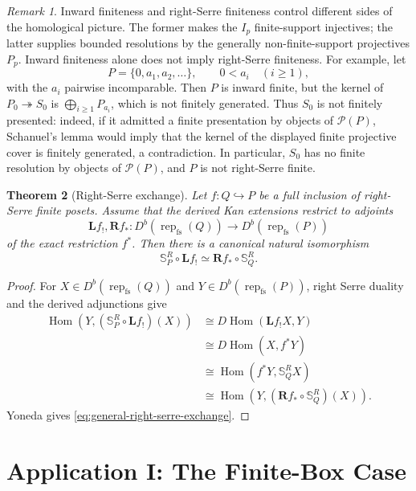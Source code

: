 \documentclass[12pt,reqno]{amsart}
\newtheorem{theorem}{Theorem}[section]
\theoremstyle{definition}
\theoremstyle{remark}
\newtheorem{remark}[theorem]{Remark}
\newcommand{\Rep}{\operatorname{rep}}
\newcommand{\Hom}{\operatorname{Hom}}
\begin{document}
\begin{remark}\label{rem:inward-not-serre}
Inward finiteness and right-Serre finiteness control different sides of the
homological picture.  The former makes the $I_p$ finite-support injectives;
the latter supplies bounded resolutions by the generally non-finite-support
projectives $P_p$.  Inward finiteness alone does not imply right-Serre
finiteness.  For example, let
\[
P=\{0,a_1,a_2,\ldots\},
\qquad
0<a_i\quad(i\ge1),
\]
with the $a_i$ pairwise incomparable.  Then $P$ is inward finite, but the
kernel of $P_0\twoheadrightarrow S_0$ is
$\bigoplus_{i\ge1}P_{a_i}$, which is not finitely generated.  Thus $S_0$
is not finitely presented: indeed, if it admitted a finite presentation by
objects of $\mathcal P(P)$, Schanuel's lemma would imply that the kernel of
the displayed finite projective cover is finitely generated, a contradiction.
In particular, $S_0$ has no finite resolution by objects of
$\mathcal P(P)$, and $P$ is not right-Serre finite.
\end{remark}

\begin{theorem}[Right-Serre exchange]\label{thm:right-serre-exchange}
Let $f:Q\hookrightarrow P$ be a full inclusion of right-Serre finite posets.
Assume that the derived Kan extensions restrict to adjoints
\[
\mathbf L f_!,\mathbf R f_*:
D^b(\Rep_{\mathrm{fs}}(Q))\longrightarrow
D^b(\Rep_{\mathrm{fs}}(P))
\]
of the exact restriction $f^*$.  Then there is a canonical natural
isomorphism
\begin{equation}\label{eq:general-right-serre-exchange}
\boxed{\mathbb S_P^R\circ\mathbf L f_!
\simeq\mathbf R f_*\circ\mathbb S_Q^R.}
\end{equation}
\end{theorem}

\begin{proof}
For $X\in D^b(\Rep_{\mathrm{fs}}(Q))$ and
$Y\in D^b(\Rep_{\mathrm{fs}}(P))$, right Serre duality and the derived
adjunctions give
\begin{align*}
\Hom(Y,(\mathbb S_P^R\circ\mathbf L f_!)(X))
&\cong D\Hom(\mathbf L f_!X,Y)\\
&\cong D\Hom(X,f^*Y)\\
&\cong\Hom(f^*Y,\mathbb S_Q^R X)\\
&\cong\Hom(Y,(\mathbf R f_*\circ\mathbb S_Q^R)(X)).
\end{align*}
Yoneda gives \eqref{eq:general-right-serre-exchange}.
\end{proof}

\section{Application I: The Finite-Box Case}
\label{sec:finite-box-recollement}
\end{document}

